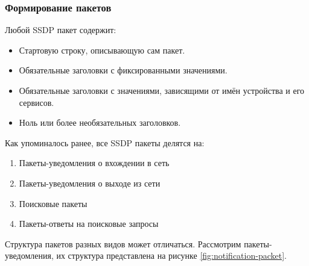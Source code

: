 \subsubsection{Формирование пакетов}

Любой SSDP пакет содержит:
\begin{itemize}
	\item Стартовую строку, описывающую сам пакет.
	\item Обязательные заголовки с фиксированными значениями.
	\item Обязательные заголовки с значениями, зависящими от имён устройства и его сервисов.
	\item Ноль или более необязательных заголовков.
\end{itemize}

Как упоминалось ранее, все SSDP пакеты делятся на:
\begin{enumerate}
	\item Пакеты-уведомления о вхождении в сеть
	\item Пакеты-уведомления о выходе из сети
	\item Поисковые пакеты
	\item Пакеты-ответы на поисковые запросы
\end{enumerate}

Структура пакетов разных видов может отличаться.
Рассмотрим пакеты-уведомления, их структура представлена на рисунке \ref{fig:notification-packet}.


